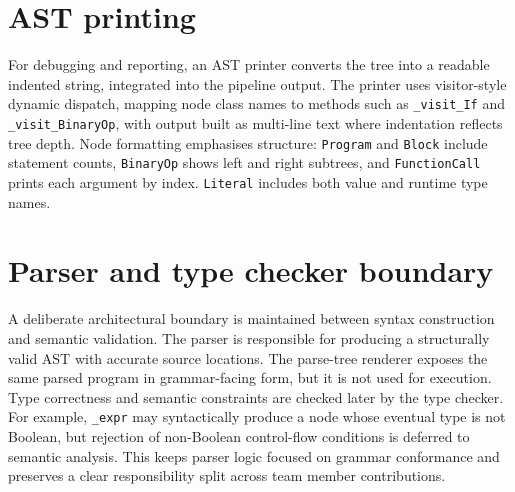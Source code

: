 \section{AST printing}
For debugging and reporting, an AST printer converts the tree into a readable
indented string, integrated into the pipeline output. The printer uses
visitor-style dynamic dispatch, mapping node class names to methods such as
\texttt{\_visit\_If} and \texttt{\_visit\_BinaryOp}, with output built as
multi-line text where indentation reflects tree depth. Node formatting
emphasises structure: \texttt{Program} and \texttt{Block} include statement
counts, \texttt{BinaryOp} shows left and right subtrees, and
\texttt{FunctionCall} prints each argument by index. \texttt{Literal} includes
both value and runtime type names.

\section{Parser and type checker boundary}
A deliberate architectural boundary is maintained between syntax construction
and semantic validation. The parser is responsible for producing a structurally
valid AST with accurate source locations. The parse-tree renderer exposes the
same parsed program in grammar-facing form, but it is not used for execution.
Type correctness and semantic constraints are checked later by the type
checker. For example, \texttt{\_expr} may syntactically produce a node whose
eventual type is not Boolean, but rejection of non-Boolean control-flow
conditions is deferred to semantic analysis. This keeps parser logic focused on
grammar conformance and preserves a clear responsibility split across team
member contributions.

